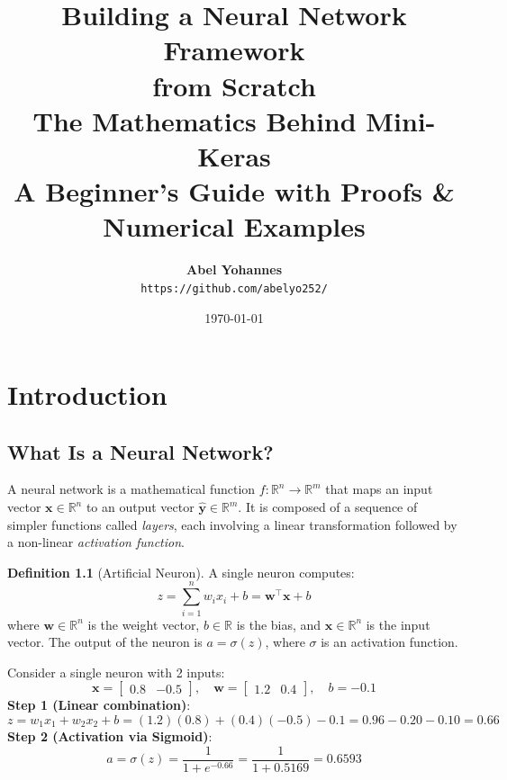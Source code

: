\documentclass[12pt, a4paper]{report}
\title{
    \vspace{-1cm}
    {\Huge\bfseries Building a Neural Network Framework\\[0.3cm] from Scratch}\\[1cm]
    {\Large The Mathematics Behind Mini-Keras}\\[0.5cm]
    {\large A Beginner's Guide with Proofs \& Numerical Examples}
}
\author{
    \textbf{Abel Yohannes}\\
    \texttt{https://github.com/abelyo252/}
}
\date{\today}
\theoremstyle{definition}
\newtheorem{definition}{Definition}[chapter]
\begin{document}
\maketitle
\tableofcontents
\newpage

\chapter{Introduction}

\section{What Is a Neural Network?}

A neural network is a mathematical function $f: \mathbb{R}^n \to \mathbb{R}^m$ that maps an input vector $\mathbf{x} \in \mathbb{R}^n$ to an output vector $\hat{\mathbf{y}} \in \mathbb{R}^m$. It is composed of a sequence of simpler functions called \textit{layers}, each involving a linear transformation followed by a non-linear \textit{activation function}.

\begin{definition}[Artificial Neuron]
A single neuron computes:
\begin{equation}
    z = \sum_{i=1}^{n} w_i x_i + b = \mathbf{w}^\top \mathbf{x} + b
\end{equation}
where $\mathbf{w} \in \mathbb{R}^n$ is the weight vector, $b \in \mathbb{R}$ is the bias, and $\mathbf{x} \in \mathbb{R}^n$ is the input vector. The output of the neuron is $a = \sigma(z)$, where $\sigma$ is an activation function.
\end{definition}

\begin{numexample}
Consider a single neuron with 2 inputs:
\[
\mathbf{x} = \begin{bmatrix} 0.8 & -0.5 \end{bmatrix}, \quad
\mathbf{w} = \begin{bmatrix} 1.2 & 0.4 \end{bmatrix}, \quad
b = -0.1
\]
\textbf{Step 1 (Linear combination)}:
\[
z = w_1 x_1 + w_2 x_2 + b = (1.2)(0.8) + (0.4)(-0.5) - 0.1 = 0.96 - 0.20 - 0.10 = \boxed{0.66}
\]
\textbf{Step 2 (Activation via Sigmoid)}:
\[
a = \sigma(z) = \frac{1}{1 + e^{-0.66}} = \frac{1}{1 + 0.5169} = \boxed{0.6593}
\]
\end{numexample}
\end{document}
